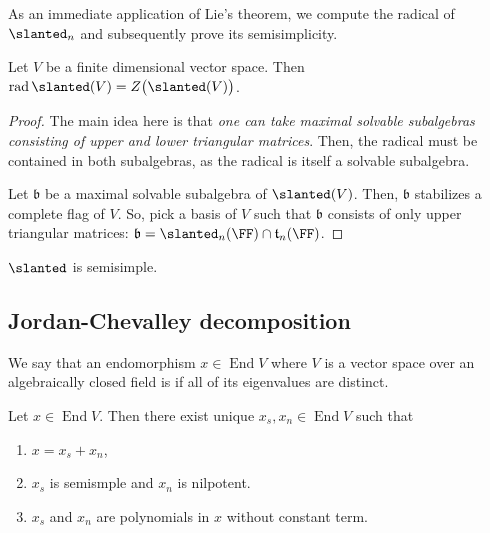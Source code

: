 \documentclass{article}
\DeclareMathOperator{\End}{End}
\DeclareMathOperator{\rad}{rad}
\newcommand*\frkb{{\ensuremath{\mathfrak{b}}}}
\let\sl\slanted
\newcommand*\sl{\ensuremath{\mathfrak{sl}}}
\newcommand*\talg{\ensuremath{\mathfrak{t}}}
\begin{document}
As an immediate application of Lie's theorem, we compute the radical of $\sl_n$ and subsequently prove its semisimplicity.

\begin{proposition}
    \cite[Exercise 4.1]{Hum72}
    Let $V$ be a finite dimensional vector space.
    Then $\rad \sl(V) = Z\big(\sl(V)\big)$.
\end{proposition}

\begin{proof}
    The main idea here is that \textit{one can take maximal solvable subalgebras consisting of upper and lower triangular matrices}.
    Then, the radical must be contained in both subalgebras, as the radical is itself a solvable subalgebra.

    Let $\frkb$ be a maximal solvable subalgebra of $\sl(V)$.
    Then, $\frkb$ stabilizes a complete flag of $V$.
    So, pick a basis of $V$ such that $\frkb$ consists of only upper triangular matrices: $\frkb = \sl_n(\FF) \cap \talg_n(\FF)$.
\end{proof}

\begin{corollary}
    $\sl$ is semisimple.
\end{corollary}

\subsection{Jordan-Chevalley decomposition}

We say that an endomorphism $x \in \End V$ where $V$ is a vector space over an algebraically closed field is  if all of its eigenvalues are distinct.

\begin{theorem}
    \label{thm:JordanChevalley}
    Let $x \in \End V$.
    Then there exist unique $x_s, x_n \in \End V$ such that
    \begin{enumerate}[label=(\alph*)]
        \item 
            $x = x_s + x_n$,
        \item 
            $x_s$ is semismple and $x_n$ is nilpotent.
        \item 
            $x_s$ and $x_n$ are polynomials in $x$ without constant term.
    \end{enumerate}
\end{theorem}
\end{document}
